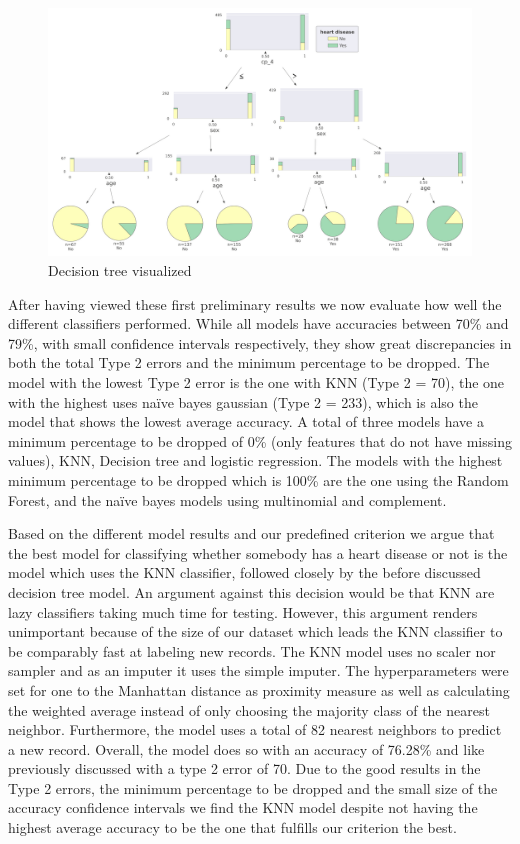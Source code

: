\begin{figure}[htbp]
	\centering
	\includegraphics[width=\textwidth]{images/DecisionTree.png}
	\caption{Decision tree visualized}
	\label{fig:DecisionTree}
\end{figure}

After having viewed these first preliminary results we now evaluate how well the different classifiers performed. While all models have accuracies between 70\% and 79\%, with small confidence intervals respectively, they show great discrepancies in both the total Type 2 errors and the minimum percentage to be dropped. The model with the lowest Type 2 error is the one with KNN (Type 2 = 70), the one with the highest uses naïve bayes gaussian (Type 2 = 233), which is also the model that shows the lowest average accuracy. A total of three models have a minimum percentage to be dropped of 0\% (only features that do not have missing values), KNN, Decision tree and logistic regression. The models with the highest minimum percentage to be dropped which is 100\% are the one using the Random Forest, and the naïve bayes models using multinomial and complement. 

Based on the different model results and our predefined criterion we argue that the best model for classifying whether somebody has a heart disease or not is the model which uses the KNN classifier, followed closely by the before discussed decision tree model. An argument against this decision would be that KNN are lazy classifiers taking much time for testing. However, this argument renders unimportant because of the size of our dataset which leads the KNN classifier to be comparably fast at labeling new records. The KNN model uses no scaler nor sampler and as an imputer it uses the simple imputer. The hyperparameters were set for one to the Manhattan distance as proximity measure as well as calculating the weighted average instead of only choosing the majority class of the nearest neighbor. Furthermore, the model uses a total of 82 nearest neighbors to predict a new record. Overall, the model does so with an accuracy of 76.28\% and like previously discussed with a type 2 error of 70. Due to the good results in the Type 2 errors, the minimum percentage to be dropped and the small size of the accuracy confidence intervals we find the KNN model despite not having the highest average accuracy to be the one that fulfills our criterion the best. 